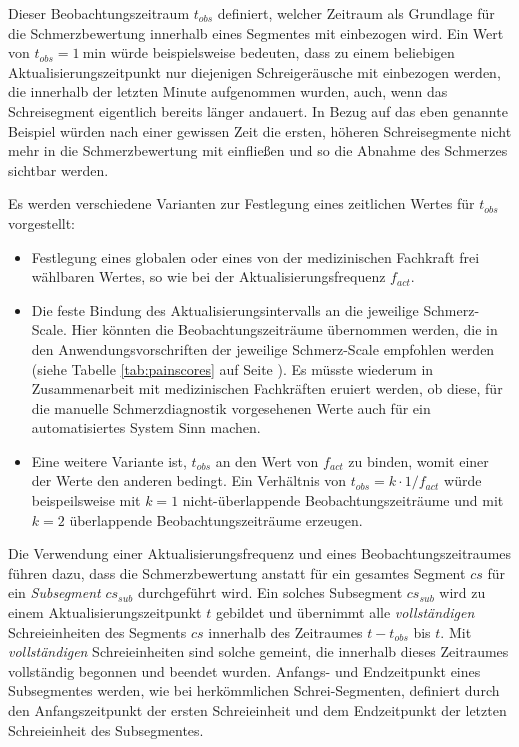 Dieser Beobachtungszeitraum $t_{obs}$ definiert, welcher Zeitraum als Grundlage für die Schmerzbewertung innerhalb eines Segmentes mit einbezogen wird. Ein Wert von ${t_{obs} = \SI{1}{\minute}}$ würde beispielsweise bedeuten, dass zu einem beliebigen Aktualisierungszeitpunkt nur diejenigen Schreigeräusche mit einbezogen werden, die innerhalb der letzten Minute aufgenommen wurden, auch, wenn das Schreisegment eigentlich bereits länger andauert. In Bezug auf das eben genannte Beispiel würden nach einer gewissen Zeit die ersten, höheren Schreisegmente nicht mehr in die Schmerzbewertung mit einfließen und so die Abnahme des Schmerzes sichtbar werden.

Es werden verschiedene Varianten zur Festlegung eines zeitlichen Wertes für $t_{obs}$ vorgestellt:
\begin{itemize}
\item Festlegung eines globalen oder eines von der medizinischen Fachkraft frei wählbaren Wertes, so wie bei der Aktualisierungsfrequenz $f_{act}$.
\item Die feste Bindung des Aktualisierungsintervalls an die jeweilige Schmerz-Scale. Hier könnten die Beobachtungszeiträume übernommen werden, die in den Anwendungsvorschriften der jeweilige Schmerz-Scale empfohlen werden (siehe Tabelle \ref{tab:painscores} auf Seite \pageref{tab:painscores}). Es müsste wiederum in Zusammenarbeit mit medizinischen Fachkräften eruiert werden, ob diese, für die manuelle Schmerzdiagnostik vorgesehenen Werte auch für ein automatisiertes System Sinn machen.
\item Eine weitere Variante ist, $t_{obs}$ an den Wert von $f_{act}$ zu binden, womit einer der Werte den anderen bedingt. Ein Verhältnis von $t_{obs} = k \cdot 1/f_{act}$ würde beispeilsweise mit $k=1$ nicht-überlappende Beobachtungszeiträume und  mit $k=2$ überlappende Beobachtungszeiträume erzeugen.
\end{itemize}

Die Verwendung einer Aktualisierungsfrequenz und eines Beobachtungszeitraumes führen dazu, dass die Schmerzbewertung anstatt für ein gesamtes Segment $cs$ für ein \emph{Subsegment} $cs_{sub}$ durchgeführt wird. Ein solches Subsegment $cs_{sub}$ wird zu einem Aktualisierungszeitpunkt $t$ gebildet und übernimmt alle \emph{vollständigen} Schreieinheiten des Segments $cs$ innerhalb des Zeitraumes $t - t_{obs}$ bis $t$. Mit \emph{vollständigen} Schreieinheiten sind solche gemeint, die innerhalb dieses Zeitraumes vollständig begonnen und beendet wurden. Anfangs- und Endzeitpunkt eines Subsegmentes werden, wie bei herkömmlichen Schrei-Segmenten, definiert durch den Anfangszeitpunkt der ersten Schreieinheit und dem Endzeitpunkt der letzten Schreieinheit des Subsegmentes. 

